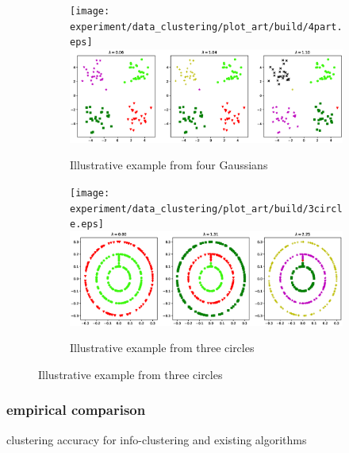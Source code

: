 \documentclass[notheorems]{beamer}
\begin{document}
\begin{frame}
\begin{figure}[!ht]
\begin{subfigure}{\textwidth}
\centering
{}
{\texttt{[image: experiment/data\_clustering/plot\_art/build/4part.eps]}}
{\includegraphics[width=12cm]{pic/4part.eps}} %

\caption{Illustrative example from four Gaussians}\label{fig:4p}
\end{subfigure}
\begin{subfigure}{\textwidth}
\centering
{}
{\texttt{[image: experiment/data\_clustering/plot\_art/build/3circle.eps]}}
{\includegraphics[width=12cm]{pic/3circle.eps}} %
\caption{Illustrative example from three circles}\label{fig:3c}
\end{subfigure}
\end{figure}
\end{frame}
\begin{frame}
\frametitle{empirical comparison}
\begin{table}[!ht]
\centering
{}
\caption{clustering accuracy for info-clustering and existing algorithms}
\end{table}
\end{frame}
\end{document}
